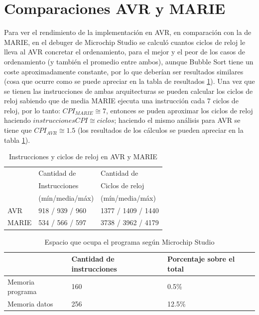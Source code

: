 \documentclass[letterpaper, 10 pt, conference]{ieeeconf}  %
\begin{document}
\section{Comparaciones AVR y MARIE}
Para ver el rendimiento de la implementación en AVR, en comparación con la de MARIE, en el debuger de Microchip Studio se calculó cuantos ciclos de reloj le lleva al AVR concretar el ordenamiento, para el mejor y el peor de los casos de ordenamiento (y también el promedio entre ambos), aunque Bubble Sort tiene un coste aproximadamente constante, por lo que deberían ser resultados similares (cosa que ocurre como se puede apreciar en la tabla de resultados \ref{tab:cant_instrucciones}). Una vez que se tienen las instrucciones de ambas arquitecturas se pueden calcular los ciclos de reloj sabiendo que de media MARIE ejecuta una instrucción cada 7 ciclos de reloj, por lo tanto: $CPI_{MARIE} \cong 7$, entonces se puden aproximar los ciclos de reloj haciendo $instrucciones CPI \cong ciclos$; haciendo el mismo análisis para AVR se tiene que $CPI_{AVR} \cong 1.5$ (los resultados de los cálculos se pueden apreciar en la tabla \ref{tab:cant_instrucciones}).

\begin{table}[H]
  \centering
  \begin{tabular}{|l|l|l|}
    \hline
                  & Cantidad de                       & Cantidad de               \\ 
                  & Instrucciones                     & Ciclos de reloj           \\ 
                  &               (mín/media/máx)     & (mín/media/máx)           \\ \hline
    AVR           & 918 / 939 / 960                   & 1377 / 1409 / 1440        \\ \hline
    MARIE         & 534 / 566 / 597                   & 3738 / 3962 / 4179        \\ \hline
  \end{tabular}
  \caption{Instrucciones y ciclos de reloj en AVR y MARIE}
  \label{tab:cant_instrucciones}
\end{table}

\begin{table}[H]
  \centering
  \begin{tabular}{|l|l|l|}
    \hline
                      & Cantidad de instrucciones   & Porcentaje sobre el total   \\ \hline
    Memoria programa  & 160                         & 0.5\%                       \\ \hline
    Memoria datos     & 256                         & 12.5\%                      \\ \hline
  \end{tabular}
  \caption{Espacio que ocupa el programa según Microchip Studio}
  \label{tab:memorio_resultado}
\end{table}
\end{document}
